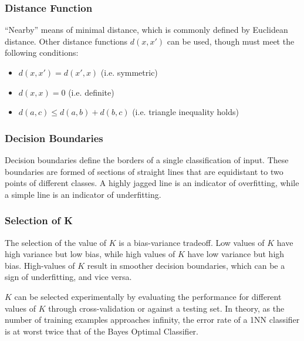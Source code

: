 \documentclass[12pt]{article}
\begin{document}
        \subsubsection{Distance Function}
            ``Nearby'' means of minimal distance, which is commonly defined by Euclidean distance. Other distance
            functions $d(x, x')$ can be used, though must meet the following conditions:
            \begin{itemize}
              \item $d(x, x') = d(x', x)$ (i.e. symmetric)
              \item $d(x, x) = 0$ (i.e. definite)
              \item $d(a, c) \leq d(a, b) + d(b, c)$ (i.e. triangle inequality holds)
            \end{itemize}

        \subsubsection{Decision Boundaries}
            Decision boundaries define the borders of a single classification of input. These boundaries are formed of
            sections of straight lines that are equidistant to two points of different classes. A highly jagged line is
            an indicator of overfitting, while a simple line is an indicator of underfitting.

        \subsubsection{Selection of K}
            The selection of the value of $K$ is a bias-variance tradeoff. Low values of $K$ have high variance but low
            bias, while high values of $K$ have low variance but high bias. High-values of $K$ result in smoother
            decision boundaries, which can be a sign of underfitting, and vice versa.

            $K$ can be selected experimentally by evaluating the performance for different values of $K$ through
            cross-validation or against a testing set. In theory, as the number of training examples approaches
            infinity, the error rate of a 1NN classifier is at worst twice that of the Bayes Optimal Classifier.
\end{document}
